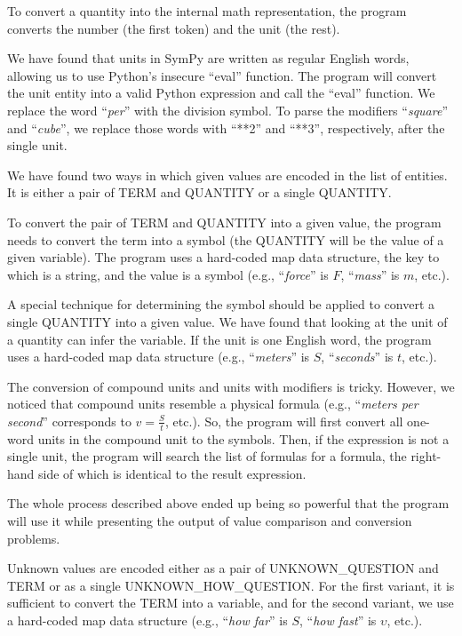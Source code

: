 \documentclass[a4paper, 12pt]{article}
\newcommand{\etext}[1]{\enquote{\textit{#1}}}
\begin{document}
	To convert a quantity into the internal math representation, the program
	converts the number (the first token) and the unit (the rest).
	
	We have found that units in SymPy are written as regular English words,
	allowing us to use Python's insecure \enquote{eval} function. The program will
	convert the unit entity into a valid Python expression and call the
	\enquote{eval} function. We replace the word \etext{per} with the division
	symbol. To parse the modifiers \etext{square} and \etext{cube}, we
	replace those words with \enquote{**2} and \enquote{**3}, respectively, after the
	single unit.
	
	We have found two ways in which given values are encoded in the list of
	entities. It is either a pair of TERM and QUANTITY or a single QUANTITY.
	
	To convert the pair of TERM and QUANTITY into a given value, the program
	needs to convert the term into a symbol (the QUANTITY will be the value
	of a given variable). The program uses a hard-coded map data structure,
	the key to which is a string, and the value is a symbol (e.g.,
	\etext{force} is \(F\), \etext{mass} is \(m\), etc.).
	
	A special technique for determining the symbol should be applied to
	convert a single QUANTITY into a given value. We have found that looking
	at the unit of a quantity can infer the variable. If the unit is one
	English word, the program uses a hard-coded map data structure (e.g.,
	\etext{meters} is \(S\), \etext{seconds} is \(t\), etc.).
	
	The conversion of compound units and units with modifiers is tricky.
	However, we noticed that compound units resemble a physical formula
	(e.g., \etext{meters per second} corresponds to \(v = \frac{S}{t}\),
	etc.). So, the program will first convert all one-word units in the
	compound unit to the symbols. Then, if the expression is not a single
	unit, the program will search the list of formulas for a formula, the
	right-hand side of which is identical to the result expression.
	
	The whole process described above ended up being so powerful that the
	program will use it while presenting the output of value comparison and
	conversion problems.
	
	Unknown values are encoded either as a pair of UNKNOWN\_QUESTION and
	TERM or as a single UNKNOWN\_HOW\_QUESTION. For the first variant, it is
	sufficient to convert the TERM into a variable, and for the second
	variant, we use a hard-coded map data structure (e.g., \etext{how
	far} is \(S\), \etext{how fast} is \(\upsilon\), etc.).
	
\end{document}
